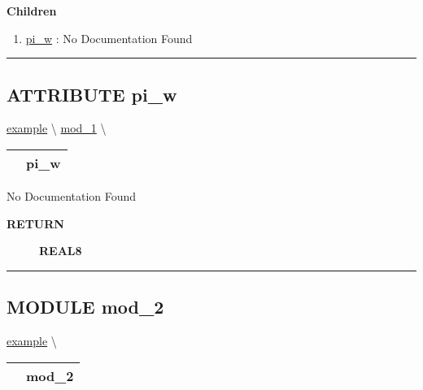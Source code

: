 \textbf{Children}
\begin{enumerate}
\item \hyperlink{ecldoc:example.mod_1.pi_w}{pi\_w}
: No Documentation Found
\end{enumerate}

\rule{\linewidth}{0.5pt}

\subsection*{\textsf{\colorbox{headtoc}{\color{white} ATTRIBUTE}
pi\_w}}

\hypertarget{ecldoc:example.mod_1.pi_w}{}
\hspace{0pt} \hyperlink{ecldoc:example}{example} \textbackslash 
\hspace{0pt} \hyperlink{ecldoc:example.mod_1}{mod_1} \textbackslash 

{\renewcommand{\arraystretch}{1.5}
\begin{tabularx}{\textwidth}{|>{\raggedright\arraybackslash}l|X|}
\hline
\hspace{0pt}\mytexttt{\color{red} } & \textbf{pi\_w} \\
\hline
\end{tabularx}
}

\par





No Documentation Found








\par
\begin{description}
\item [\colorbox{tagtype}{\color{white} \textbf{\textsf{RETURN}}}] \textbf{REAL8} 
\end{description}




\rule{\linewidth}{0.5pt}


\subsection*{\textsf{\colorbox{headtoc}{\color{white} MODULE}
mod\_2}}

\hypertarget{ecldoc:example.mod_2}{}
\hspace{0pt} \hyperlink{ecldoc:example}{example} \textbackslash 

{\renewcommand{\arraystretch}{1.5}
\begin{tabularx}{\textwidth}{|>{\raggedright\arraybackslash}l|X|}
\hline
\hspace{0pt}\mytexttt{\color{red} } & \textbf{mod\_2} \\
\hline
\end{tabularx}
}

